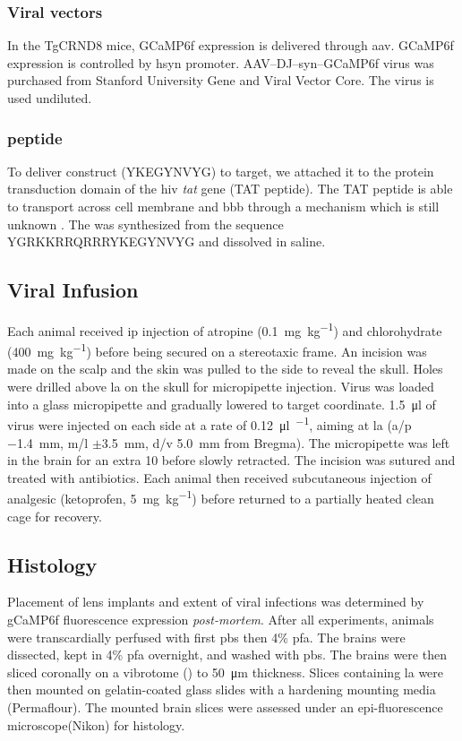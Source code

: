 \subsubsection{Viral vectors}
In the TgCRND8 mice, GCaMP6f expression is delivered through \gls{aav}. GCaMP6f expression is controlled by \gls{hsyn} promoter. AAV--DJ--syn--GCaMP6f virus was purchased from Stanford University Gene and Viral Vector Core. The virus is used undiluted. 

\subsubsection{\tglu peptide}
To deliver \glu construct (YKEGYNVYG) to target, we attached it to the protein transduction domain of the \gls{hiv} \textit{tat} gene (TAT peptide). The TAT peptide is able to transport across cell membrane and \gls{bbb} through a mechanism which is still unknown . The \tglu was synthesized from the sequence YGRKKRRQRRRYKEGYNVYG and dissolved in saline. 


\subsection{Viral Infusion}

Each animal received \gls{ip} injection of atropine (\SI{0.1}{\mg\per\kg}) and chlorohydrate (\SI{400}{\mg\per\kg}) before being secured on a stereotaxic frame. An incision was made on the scalp and the skin was pulled to the side to reveal the skull. Holes were drilled above \gls{la} on the skull for micropipette injection. Virus was loaded into a glass micropipette and gradually lowered to target coordinate. \SI{1.5}{\ul} of virus were injected on each side at a rate of \SI{0.12}{\ul\per\min}, aiming at \gls{la} (\gls{a/p} \SI{-1.4}{\mm}, \gls{m/l} $\pm$\SI{3.5}{\mm}, \gls{d/v} \SI{5.0}{\mm} from Bregma). The micropipette was left in the brain for an extra \SI{10}{\min} before slowly retracted. The incision was sutured and treated with antibiotics. Each animal then received subcutaneous injection of analgesic (ketoprofen, \SI{5}{\mg\per\kg}) before returned to a partially heated clean cage for recovery.

\subsection{Histology}
Placement of lens implants and extent of viral infections was determined by gCaMP6f fluorescence expression \textit{post-mortem}. After all experiments, animals were transcardially perfused with first \gls{pbs} then 4\% \gls{pfa}. The brains were dissected,  kept in 4\% \gls{pfa} overnight, and washed with \gls{pbs}. The brains were then sliced coronally on a vibrotome () to \SI{50}{\um} thickness. Slices containing \gls{la} were then mounted on gelatin-coated glass slides with a hardening mounting media (Permaflour). The mounted brain slices were assessed under an epi-fluorescence microscope(Nikon) for histology.


